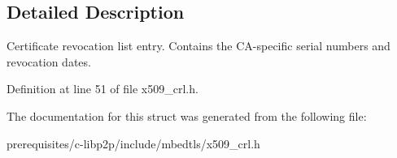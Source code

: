 \subsection{Detailed Description}
Certificate revocation list entry. Contains the C\+A-\/specific serial numbers and revocation dates. 

Definition at line 51 of file x509\+\_\+crl.\+h.



The documentation for this struct was generated from the following file\+:\begin{DoxyCompactItemize}
\item 
prerequisites/c-\/libp2p/include/mbedtls/x509\+\_\+crl.\+h\end{DoxyCompactItemize}
